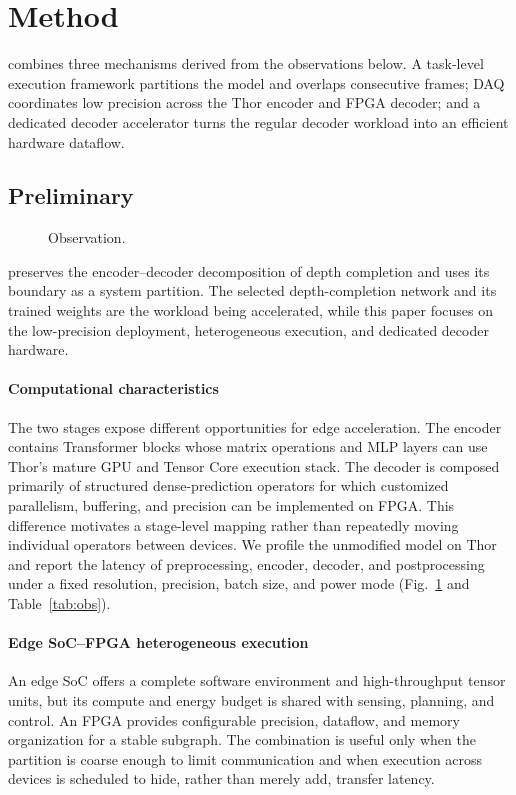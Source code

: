 \section{Method}
\label{sec:method}

\system{} combines three mechanisms derived from the observations below.  A
task-level execution framework partitions the model and overlaps consecutive
frames; DAQ coordinates low precision across the Thor encoder and FPGA decoder;
and a dedicated decoder accelerator turns the regular decoder workload into an
efficient hardware dataflow.

\subsection{Preliminary}
\label{sec:preliminary}

\begin{figure}[t]
  \centering
  \caption{Observation. \pending}
  \label{fig:obs}
\end{figure}

\system{} preserves the encoder--decoder decomposition of depth completion and
uses its boundary as a system partition.  The selected depth-completion network
and its trained weights are the workload being accelerated, while this paper
focuses on the low-precision deployment, heterogeneous execution, and dedicated
decoder hardware.

\paragraph{Computational characteristics}
The two stages expose different opportunities for edge acceleration.  The
encoder contains Transformer blocks whose matrix operations and MLP layers can
use Thor's mature GPU and Tensor Core execution stack.  The decoder is composed
primarily of structured dense-prediction operators for which customized
parallelism, buffering, and precision can be implemented on FPGA.  This
difference motivates a stage-level mapping rather than repeatedly moving
individual operators between devices.  We profile the unmodified model on Thor
and report the latency of preprocessing, encoder, decoder, and postprocessing
under a fixed resolution, precision, batch size, and power mode
(Fig.~\ref{fig:obs} and Table~\ref{tab:obs}).

\paragraph{Edge SoC--FPGA heterogeneous execution}
An edge SoC offers a complete software environment and high-throughput tensor
units, but its compute and energy budget is shared with sensing, planning, and
control.  An FPGA provides configurable precision, dataflow, and memory
organization for a stable subgraph.  The combination is useful only when the
partition is coarse enough to limit communication and when execution across
devices is scheduled to hide, rather than merely add, transfer latency.

